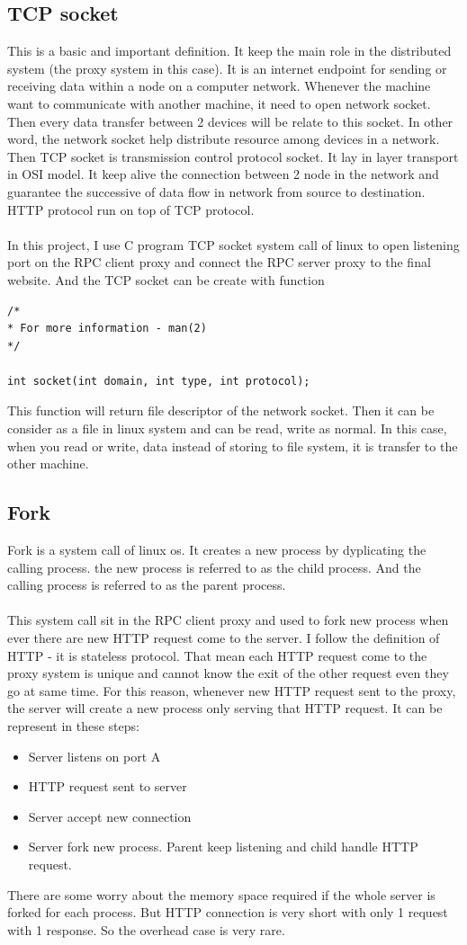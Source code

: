 \documentclass{article}
\begin{document}
\subsection{TCP socket}
This is a basic and important definition. It keep the main role in the
distributed system (the proxy system in this case). It is an internet endpoint
for sending or receiving data within a node on a computer
network. Whenever the machine
want to communicate with another machine, it need to open network socket.
Then every data transfer between 2 devices will be relate to this socket.
In other word, the network socket help distribute resource among devices in
a network. Then TCP socket is transmission control protocol socket. It lay in
layer transport in OSI model. It keep alive the connection between 2 node in
the network and guarantee the successive of data flow in network from source
to destination. HTTP protocol run on top of TCP protocol.\\
\\
In this project, I use C program TCP socket system call of linux to open listening
port on the RPC client proxy and connect the RPC server proxy to the final website.
And the TCP socket can be create with function
\begin{verbatim}
/*
* For more information - man(2)
*/

int socket(int domain, int type, int protocol);
\end{verbatim}
This function will return file descriptor of the network socket.
Then it can be consider as a file in linux system and can be
read, write as normal. In this case, when you read or write, data
instead of storing to file system, it is transfer to the other machine.
\subsection{Fork}
Fork is a system call of linux os. It creates a new process by dyplicating
the calling process. the new process is referred to as the child process.
And the calling process is referred to as the parent process.\\
\\
This system call sit in the RPC client proxy and used to fork 
new process when ever there are new HTTP request come to the server.
I follow the definition of HTTP - it is stateless protocol. That mean
each HTTP request come to the proxy system is unique 
and cannot know the exit of the other request even they go at same time.
For this reason, whenever new HTTP request sent to the proxy, the server
will create a new process only serving that HTTP request. It can be
represent in these steps:
\begin{itemize}
\item Server listens on port A
\item HTTP request sent to server
\item Server accept new connection
\item Server fork new process. Parent keep listening
and child handle HTTP request.
\end{itemize}
There are some worry about the memory space required if the whole server is
forked for each process. But HTTP connection is very short with only 1 request
with 1 response. So the overhead case is very rare.
\end{document}
